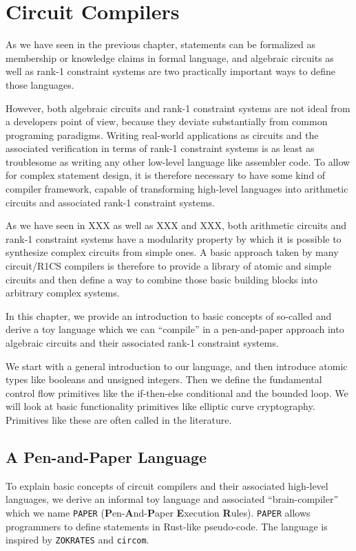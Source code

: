 \chapter{Circuit Compilers} 
As we have seen in the previous chapter, statements can be formalized as membership or knowledge claims in formal language, and algebraic circuits as well as rank-1 constraint systems are two practically important ways to define those languages.

However, both algebraic circuits and rank-1 constraint systems are not ideal from a developers point of view, because they deviate substantially from common programing paradigms. Writing real-world applications as circuits and the associated verification in terms of rank-1 constraint systems is as least as troublesome as writing any other low-level language like assembler code. To allow for complex statement design, it is therefore necessary to have some kind of compiler framework, capable of transforming high-level languages into arithmetic circuits and associated rank-1 constraint systems. 

As we have seen in XXX as well as XXX and XXX, both arithmetic circuits and rank-1 constraint systems have a modularity property by which it is possible to synthesize complex circuits from simple ones. A basic approach taken by many circuit/R1CS compilers is therefore to provide a library of atomic and simple circuits and then define a way to combine those basic building blocks into arbitrary complex systems.

In this chapter, we provide an introduction to basic concepts of so-called  and derive a toy language which we can ``compile'' in a pen-and-paper approach into algebraic circuits and their associated rank-1 constraint systems.

We start with a general introduction to our language, and then introduce atomic types like booleans and unsigned integers. Then we define the fundamental control flow primitives like the if-then-else conditional and the bounded loop. We will look at basic functionality primitives like elliptic curve cryptography. Primitives like these are often called  in the literature. 
\section{A Pen-and-Paper Language} To explain basic concepts of circuit compilers and their associated high-level languages, we derive an informal toy language and associated ``brain-compiler'' which we name \texttt{PAPER} (\textbf{P}en-\textbf{A}nd-\textbf{P}aper \textbf{E}xecution \textbf{R}ules). \texttt{PAPER} allows programmers to define statements in Rust-like pseudo-code. The language is inspired by \texttt{ZOKRATES} and \texttt{circom}.
 
